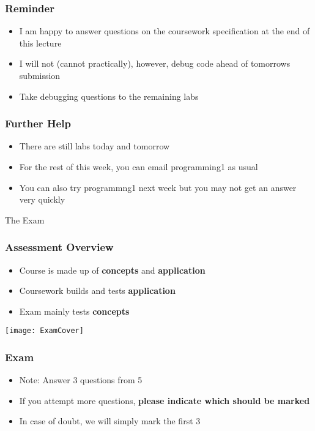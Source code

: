 \documentclass{beamer}
\begin{document}
\begin{frame}
\frametitle{Reminder}
\begin{itemize}
\item I am happy to answer questions on the coursework specification at the end of this lecture
\item I will not (cannot practically), however, debug code ahead of tomorrows submission
\item Take debugging questions to the remaining labs
\end{itemize}
\end{frame}

\begin{frame}
\frametitle{Further Help}
\begin{itemize}
\item There are still labs today and tomorrow
\item For the rest of this week, you can email programming1 as usual
\item You can also try programmng1 next week but you may not get an answer very quickly
\end{itemize}
\end{frame}

\begin{frame}
\begin{center}
The Exam
\end{center}
\end{frame}

\begin{frame}
\frametitle{Assessment Overview}
\begin{itemize}
\item Course is made up of \textbf{concepts} and \textbf{application}
\bigskip
\item Coursework builds and tests \textbf{application}
\item Exam mainly tests \textbf{concepts}
\end{itemize}
\end{frame}

\begin{frame}
\begin{center}
\texttt{[image: ExamCover]}
\end{center}
\end{frame}

\begin{frame}
\frametitle{Exam}
\begin{itemize}
\item Note: Answer 3 questions from 5
\item If you attempt more questions, \textbf{please indicate which should be marked}
\item In case of doubt, we will simply mark the first 3
\end{itemize}
\end{frame}
\end{document}
